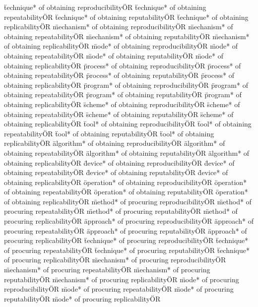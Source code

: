\documentclass[
10pt, %
a4paper, %
oneside, %
headinclude,footinclude, %
BCOR5mm, %
]{scrartcl}
\begin{document}
\"technique* of obtaining reproducibility\" OR \"technique* of obtaining repeatability\" OR \"technique* of obtaining reputability\" OR \"technique* of obtaining replicability\" OR 
\"mechanism* of obtaining reproducibility\" OR \"mechanism* of obtaining repeatability\" OR \"mechanism* of obtaining reputability\" OR \"mechanism* of obtaining replicability\" OR 
\"mode* of obtaining reproducibility\" OR \"mode* of obtaining repeatability\" OR \"mode* of obtaining reputability\" OR \"mode* of obtaining replicability\" OR 
\"process* of obtaining reproducibility\" OR \"process* of obtaining repeatability\" OR \"process* of obtaining reputability\" OR \"process* of obtaining replicability\" OR 
\"program* of obtaining reproducibility\" OR \"program* of obtaining repeatability\" OR \"program* of obtaining reputability\" OR \"program* of obtaining replicability\" OR 
\"scheme* of obtaining reproducibility\" OR \"scheme* of obtaining repeatability\" OR \"scheme* of obtaining reputability\" OR \"scheme* of obtaining replicability\" OR 
\"tool* of obtaining reproducibility\" OR \"tool* of obtaining repeatability\" OR \"tool* of obtaining reputability\" OR \"tool* of obtaining replicability\" OR 
\"algorithm* of obtaining reproducibility\" OR \"algorithm* of obtaining repeatability\" OR \"algorithm* of obtaining reputability\" OR \"algorithm* of obtaining replicability\" OR 
\"device* of obtaining reproducibility\" OR \"device* of obtaining repeatability\" OR \"device* of obtaining reputability\" OR \"device* of obtaining replicability\" OR 
\"operation* of obtaining reproducibility\" OR \"operation* of obtaining repeatability\" OR \"operation* of obtaining reputability\" OR \"operation* of obtaining replicability\" OR 
\"method* of procuring reproducibility\" OR \"method* of procuring repeatability\" OR \"method* of procuring reputability\" OR \"method* of procuring replicability\" OR 
\"approach* of procuring reproducibility\" OR \"approach* of procuring repeatability\" OR \"approach* of procuring reputability\" OR \"approach* of procuring replicability\" OR 
\"technique* of procuring reproducibility\" OR \"technique* of procuring repeatability\" OR \"technique* of procuring reputability\" OR \"technique* of procuring replicability\" OR 
\"mechanism* of procuring reproducibility\" OR \"mechanism* of procuring repeatability\" OR \"mechanism* of procuring reputability\" OR \"mechanism* of procuring replicability\" OR 
\"mode* of procuring reproducibility\" OR \"mode* of procuring repeatability\" OR \"mode* of procuring reputability\" OR \"mode* of procuring replicability\" OR 
\end{document}
